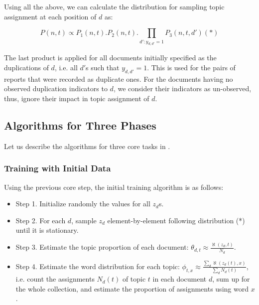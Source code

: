 
Using all the above, we can calculate the distribution for sampling
topic assignment at each position of $d$ as:

$$P(n,t) \propto P_1(n,t).P_2(n,t). \prod_{d': y_{d,d'}=1} P_3(n,t,d')(*)$$

The last product is applied for all documents initially specified as
the duplications of $d$, i.e. all $d'$s such that $y_{d,d'} = 1$. This
is used for the pairs of reports that were recorded as duplicate
ones. For the documents having no observed duplication indicators to
$d$, we consider their indicators as un-observed, thus, ignore their
impact in topic assignment of $d$.

\subsection{Algorithms for Three Phases}

Let us describe the algorithms for three core tasks in {\model}.


\subsubsection{Training with Initial Data}

Using the previous core step, the initial training algorithm is as
follows:

\begin{itemize}

\item Step 1. Initialize randomly the values for all $z_d$s.

\item Step 2. For each $d$, sample $z_d$ element-by-element following
distribution (*) until it is stationary.

\item Step 3. Estimate the topic proportion of each document: $\theta_{d,t}
\approx \frac {\aleph(z_d,t)} {N_d}$.

\item Step 4. Estimate the word distribution for each topic: $\phi_{t,x}
\approx \frac {\sum_{d}{\aleph(z_d(t),x)}} {\sum_{d} {N_d(t)}}$,
i.e. count the assignments $N_d(t)$ of topic $t$ in each document $d$,
sum up for the whole collection, and estimate the proportion of
assignments using word $x$.

\end{itemize}

